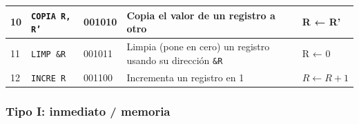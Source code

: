 \documentclass{article}
\begin{document}
\begin{longtable}{|p{}|p{}|p{}|p{}|p{}|}
  \hline
  10              & \texttt{COPIA R, R'}        & 001010                          & Copia el valor de un registro a otro                               & R ← R'                                     \\
  \hline
  11              & \texttt{LIMP \&R}           & 001011                          & Limpia (pone en cero) un registro usando su dirección \texttt{\&R} & R ← 0                                      \\
  \hline
  12              & \texttt{INCRE R}            & 001100                          & Incrementa un registro en 1                                        & $R \leftarrow R + 1$                       \\
  \hline
\end{longtable}

\subsubsection{Tipo I: \textbf{inmediato / memoria}}
\end{document}
